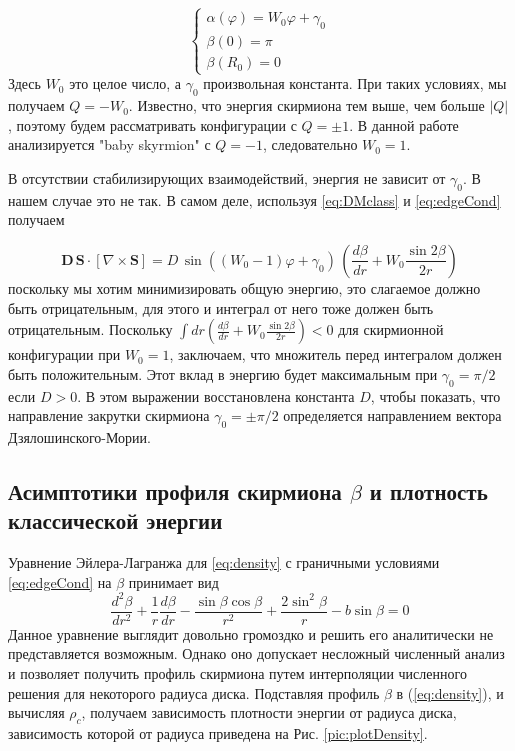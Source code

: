 \documentclass[a4paper,article,14pt]{extarticle}
\begin{document}
\begin{equation}
\label{eq:edgeCond}
{\left\{ {\begin{array}{*{20}{c}}
  {\alpha \left( \varphi  \right) = {W_0}\varphi  + {\gamma _0}} \\ 
  {\beta (0) = \pi } \\ 
  {\beta ({R_0}) = 0} 
\end{array}} \right.}
\end{equation}
Здесь $W_0$ это целое число, а $\gamma _0$ произвольная константа. При таких условиях, мы получаем $Q=-W_0$. Известно, что энергия скирмиона тем выше, чем больше $|Q|$ \cite{rajaraman, belavin}, поэтому будем рассматривать конфигурации с $Q=\pm 1$. В данной работе анализируется "baby skyrmion" с $Q=-1$, следовательно $W_0 = 1$.

В отсутствии стабилизирующих взаимодействий, энергия не зависит от $\gamma_0$. В нашем случае это не так. В самом деле, используя \eqref{eq:DMclass} и \eqref{eq:edgeCond} получаем

\[\mathbf{D} \, {\mathbf{S}} \cdot \left[ {\nabla  \times {\mathbf{S}}} \right] = D \, \sin \left( {\left( {{W_0} - 1} \right) \varphi  + {\gamma _0}} \right)\,\left( {\frac{{d\beta }}{{dr}} + {W_0}\frac{{\sin 2\beta }}{{2r}}} \right)\]
поскольку мы хотим минимизировать общую энергию, это слагаемое должно быть отрицательным, для этого и интеграл от него тоже должен быть отрицательным. Поскольку $\int {d{r}} \left( {\frac{{d\beta }}{{dr}} + {W_0}\frac{{\sin 2\beta }}{{2r}}} \right) < 0$ для скирмионной конфигурации  при $W_0=1$,  заключаем, что множитель перед интегралом должен быть положительным. Этот вклад в энергию будет максимальным при $\gamma_0 = \pi/2$ если $D>0$. В этом выражении восстановлена константа $D$, чтобы показать, что направление закрутки скирмиона $\gamma_0 = \pm \pi/2$ определяется направлением вектора Дзялошинского-Мории.


\subsection{Асимптотики профиля скирмиона $\beta$ и плотность классической энергии}

Уравнение Эйлера-Лагранжа для \eqref{eq:density} с граничными условиями \eqref{eq:edgeCond} на $\beta$ принимает вид
\begin{equation}
\label{eq:eulerLagr}
\frac{{{d^2}\beta }}{{d{r^2}}} + \frac{1}{r}\frac{{d\beta }}{{dr}} - \frac{{\sin \beta \cos \beta }}{{{r^2}}} + \frac{{2{{\sin }^2}\beta }}{r} - b\sin \beta  = 0
\end{equation}
Данное уравнение выглядит довольно громоздко и решить его аналитически не представляется возможным. Однако оно допускает несложный численный анализ и позволяет получить профиль скирмиона путем интерполяции численного решения для некоторого радиуса диска.\cite{bogdanov} Подставляя профиль $\beta$ в (\ref{eq:density}), и вычисляя $\rho_c$, получаем зависимость плотности энергии от радиуса диска, зависимость которой от радиуса приведена на Рис. \ref{pic:plotDensity}.
\end{document}

